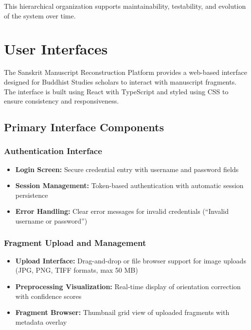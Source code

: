 \documentclass[12pt, titlepage]{article}
\begin{document}
This hierarchical organization supports maintainability, testability, and evolution of the system over time.


\section{User Interfaces}

The Sanskrit Manuscript Reconstruction Platform provides a web-based interface designed for Buddhist Studies scholars to interact with manuscript fragments. The interface is built using React with TypeScript and styled using CSS to ensure consistency and responsiveness.

\subsection{Primary Interface Components}

\subsubsection{Authentication Interface}
\begin{itemize}
    \item \textbf{Login Screen:} Secure credential entry with username and password fields
    \item \textbf{Session Management:} Token-based authentication with automatic session persistence
    \item \textbf{Error Handling:} Clear error messages for invalid credentials (``Invalid username or password'')
\end{itemize}

\subsubsection{Fragment Upload and Management}
\begin{itemize}
    \item \textbf{Upload Interface:} Drag-and-drop or file browser support for image uploads (JPG, PNG, TIFF formats, max 50 MB)
    \item \textbf{Preprocessing Visualization:} Real-time display of orientation correction with confidence scores
    \item \textbf{Fragment Browser:} Thumbnail grid view of uploaded fragments with metadata overlay
\end{itemize}
\end{document}
